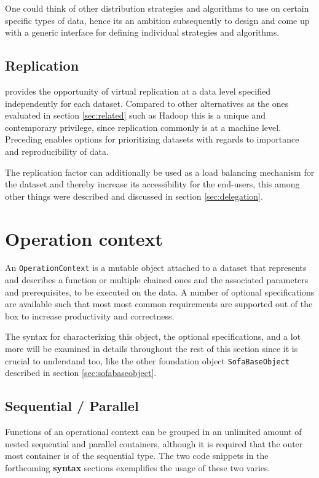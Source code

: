 One could think of other distribution strategies and algorithms to use on certain specific types of data, hence its an ambition subsequently to design and come up with a generic interface for defining individual strategies and algorithms.

\subsection{Replication}
\CodeName provides the opportunity of virtual replication at a data level specified independently for each dataset. Compared to other alternatives as the ones evaluated in section \ref{sec:related} such as Hadoop this is a unique and contemporary privilege, since replication commonly is at a machine level. Preceding enables options for prioritizing datasets with regards to importance and reproducibility of data.
\newline

The replication factor can additionally be used as a load balancing mechanism for the dataset and thereby increase its accessibility for the end-users, this among other things were described and discussed in section \ref{sec:delegation}.

\section{Operation context} \label{sec:operation}
An \texttt{OperationContext} is a mutable object attached to a dataset that represents and describes a function or multiple chained ones and the associated parameters and prerequisites, to be executed on the data. A number of optional specifications are available such that most most common requirements are supported out of the box to increase productivity and correctness.
\newline

The syntax for characterizing this object, the optional specifications, and a lot more will be examined in details throughout the rest of this section since it is crucial to understand too, like the other foundation object \texttt{SofaBaseObject} described in section \ref{sec:sofabaseobject}.

\subsection{Sequential / Parallel}
Functions of an operational context can be grouped in an unlimited amount of nested sequential and parallel containers, although it is required that the outer most container is of the sequential type. The two code snippets in the forthcoming \textbf{syntax} sections exemplifies the usage of these two varies.

